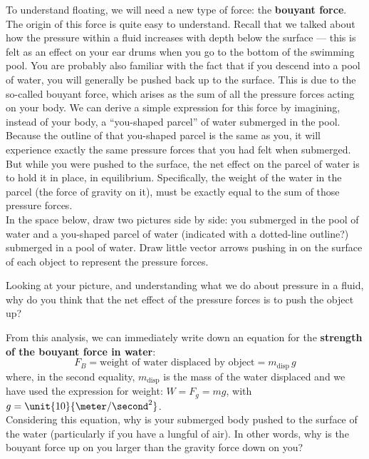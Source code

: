 \noindent To understand floating, we will need a new type of force: the {\bf bouyant force}.  The origin of this force is quite easy to understand.  Recall that we talked about how the pressure within a fluid increases with depth below the surface --- this is felt as an effect on your ear drums when you go to the bottom of the swimming pool. You are probably also familiar with the fact that if you descend into a pool of water, you will generally be pushed back up to the surface.  This is due to the so-called bouyant force, which arises as the sum of all the pressure forces acting on your body.  We can derive a simple expression for this force by imagining, instead of your body, a ``you-shaped parcel'' of water submerged in the pool.  Because the outline of that you-shaped parcel is the same as you, it will experience exactly the same pressure forces that you had felt when submerged.  But while you were pushed to the surface, the net effect on the parcel of water is to hold it in place, in equilibrium.  Specifically, the weight of the water in the parcel (the force of gravity on it), must be exactly equal to the sum of those pressure forces.  \\[-6pt]

\noindent In the space below, draw two pictures side by side: you submerged in the pool of water and a you-shaped parcel of water (indicated with a dotted-line outline?) submerged in a pool of water.  Draw little vector arrows pushing in on the surface of each object to represent the pressure forces.  

\answerspace[5cm]

\noindent Looking at your picture, and understanding what we do about pressure in a fluid, why do you think that the net effect of the pressure forces is to push the object up?

\answerspace[5cm]

\noindent From this analysis, we can immediately write down an equation for the {\bf strength of the bouyant force in water}:
	\begin{equation*}
	F_B = \text{weight of water displaced by object} = m_\text{disp} \, g
	\end{equation*}
where, in the second equality, $m_\text{disp}$ is the mass of the water displaced and we have used the expression for weight: $W = F_g = m g$, with $g = \unit{10}{\meter/\second^2}$.\\[-6pt]

\noindent Considering this equation, why is your submerged body pushed to the surface of the water (particularly if you have a lungful of air). In other words, why is the bouyant force up on you larger than the gravity force down on you?

